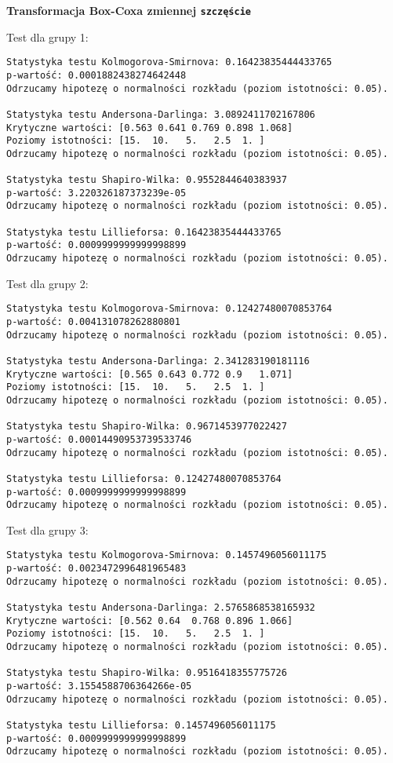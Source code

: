 \documentclass[12pt,a4paper]{article}
\begin{document}
\newpage
\begin{center}
    \textbf{Transformacja Box-Coxa zmiennej \texttt{szczęście}}
\end{center}
Test dla grupy 1:
\begin{lstlisting}
Statystyka testu Kolmogorova-Smirnova: 0.16423835444433765
p-wartość: 0.0001882438274642448
Odrzucamy hipotezę o normalności rozkładu (poziom istotności: 0.05).

Statystyka testu Andersona-Darlinga: 3.0892411702167806
Krytyczne wartości: [0.563 0.641 0.769 0.898 1.068]
Poziomy istotności: [15.  10.   5.   2.5  1. ]
Odrzucamy hipotezę o normalności rozkładu (poziom istotności: 0.05).

Statystyka testu Shapiro-Wilka: 0.9552844640383937
p-wartość: 3.220326187373239e-05
Odrzucamy hipotezę o normalności rozkładu (poziom istotności: 0.05).

Statystyka testu Lillieforsa: 0.16423835444433765
p-wartość: 0.0009999999999998899
Odrzucamy hipotezę o normalności rozkładu (poziom istotności: 0.05).
\end{lstlisting}
Test dla grupy 2:
\begin{lstlisting}
Statystyka testu Kolmogorova-Smirnova: 0.12427480070853764
p-wartość: 0.004131078262880801
Odrzucamy hipotezę o normalności rozkładu (poziom istotności: 0.05).

Statystyka testu Andersona-Darlinga: 2.341283190181116
Krytyczne wartości: [0.565 0.643 0.772 0.9   1.071]
Poziomy istotności: [15.  10.   5.   2.5  1. ]
Odrzucamy hipotezę o normalności rozkładu (poziom istotności: 0.05).

Statystyka testu Shapiro-Wilka: 0.9671453977022427
p-wartość: 0.00014490953739533746
Odrzucamy hipotezę o normalności rozkładu (poziom istotności: 0.05).

Statystyka testu Lillieforsa: 0.12427480070853764
p-wartość: 0.0009999999999998899
Odrzucamy hipotezę o normalności rozkładu (poziom istotności: 0.05).
\end{lstlisting}
Test dla grupy 3:
\begin{lstlisting}
Statystyka testu Kolmogorova-Smirnova: 0.1457496056011175
p-wartość: 0.0023472996481965483
Odrzucamy hipotezę o normalności rozkładu (poziom istotności: 0.05).

Statystyka testu Andersona-Darlinga: 2.5765868538165932
Krytyczne wartości: [0.562 0.64  0.768 0.896 1.066]
Poziomy istotności: [15.  10.   5.   2.5  1. ]
Odrzucamy hipotezę o normalności rozkładu (poziom istotności: 0.05).

Statystyka testu Shapiro-Wilka: 0.9516418355775726
p-wartość: 3.1554588706364266e-05
Odrzucamy hipotezę o normalności rozkładu (poziom istotności: 0.05).

Statystyka testu Lillieforsa: 0.1457496056011175
p-wartość: 0.0009999999999998899
Odrzucamy hipotezę o normalności rozkładu (poziom istotności: 0.05).
\end{lstlisting}
\end{document}
